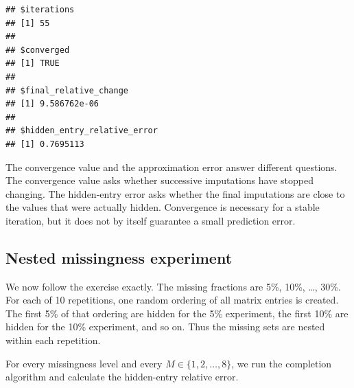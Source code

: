 \documentclass[
  11pt,
]{article}
\newenvironment{Shaded}{\begin{snugshade}}{\end{snugshade}}
\newcommand{\AttributeTok}[1]{\textcolor[rgb]{0.13,0.29,0.53}{#1}}
\newcommand{\DecValTok}[1]{\textcolor[rgb]{0.00,0.00,0.81}{#1}}
\newcommand{\FunctionTok}[1]{\textcolor[rgb]{0.13,0.29,0.53}{\textbf{#1}}}
\newcommand{\NormalTok}[1]{#1}
\newcommand{\SpecialCharTok}[1]{\textcolor[rgb]{0.81,0.36,0.00}{\textbf{#1}}}
\begin{document}
\begin{Shaded}
\end{Shaded}

\begin{verbatim}
## $iterations
## [1] 55
## 
## $converged
## [1] TRUE
## 
## $final_relative_change
## [1] 9.586762e-06
## 
## $hidden_entry_relative_error
## [1] 0.7695113
\end{verbatim}

The convergence value and the approximation error answer different
questions. The convergence value asks whether successive imputations
have stopped changing. The hidden-entry error asks whether the final
imputations are close to the values that were actually hidden.
Convergence is necessary for a stable iteration, but it does not by
itself guarantee a small prediction error.

\subsection{Nested missingness
experiment}\label{nested-missingness-experiment}

We now follow the exercise exactly. The missing fractions are 5\%, 10\%,
\ldots, 30\%. For each of 10 repetitions, one random ordering of all
matrix entries is created. The first 5\% of that ordering are hidden for
the 5\% experiment, the first 10\% are hidden for the 10\% experiment,
and so on. Thus the missing sets are nested within each repetition.

For every missingness level and every \(M\in\{1,2,\ldots,8\}\), we run
the completion algorithm and calculate the hidden-entry relative error.
\end{document}
